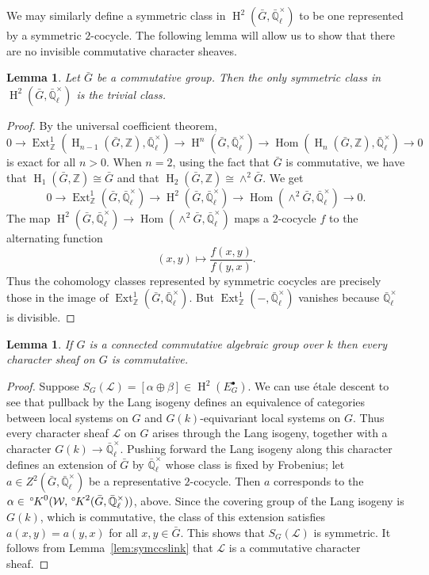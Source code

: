 \documentclass[10pt]{amsart}
\theoremstyle{plain}
\newtheorem{lemma}[theorem]{Lemma}
\theoremstyle{definition}
\newcommand{\ZZ}{{\mathbb{Z}}}
\newcommand{\EE}{\mathbb{\bar Q}_\ell}
\newcommand{\Fq}{k}
\newcommand{\EEx}{\EE^\times}
\newcommand{\Weil}[1]{\mathcal{W}_{#1}}
\DeclareMathOperator{\Hom}{Hom}
\DeclareMathOperator{\Ext}{Ext}
\DeclareMathOperator{\Hh}{H}
\newcommand{\cs}[1]{{\mathcal{#1}}}
\newcommand{\bG}{\bar{G}}
\newcommand{\oK}{{\,^\circ \hskip-1pt K}}
\begin{document}
We may similarly define a symmetric class in $\Hh^2(\bG, \EEx)$ to be one represented by a symmetric $2$-cocycle.
The following lemma will allow us to show that there are no invisible commutative character sheaves.

\begin{lemma} \label{lem:symtriv}
Let $\bG$ be a commutative group.  Then the only symmetric class in $\Hh^2(\bG, \EEx)$ is the trivial class.
\end{lemma}

\begin{proof}
By the universal coefficient theorem,
\[
0 \to \Ext^1_\ZZ(\Hh_{n-1}(\bG, \ZZ), \EEx) \to \Hh^n(\bG, \EEx) \to \Hom(\Hh_n(\bG, \ZZ), \EEx) \to 0
\]
is exact for all $n > 0$.  When $n = 2$, using the fact that $\bG$ is commutative, we have that $\Hh_1(\bG, \ZZ) \cong \bG$
and that $\Hh_2(\bG, \ZZ) \cong \wedge^2 \bG$. We get
\[
0 \to \Ext^1_\ZZ(\bG, \EEx) \to \Hh^2(\bG, \EEx) \to \Hom(\wedge^2 \bG, \EEx) \to 0.
\]
The map $\Hh^2(\bG, \EEx) \to \Hom(\wedge^2 \bG, \EEx)$ maps a $2$-cocycle $f$ to the alternating function
\[
(x,y) \mapsto \frac{f(x,y)}{f(y,x)}.
\]
Thus the cohomology classes represented by symmetric cocycles are precisely those in the image of $\Ext^1_\ZZ(\bG, \EEx)$.
But $\Ext^1_\ZZ(-, \EEx)$ vanishes because $\EEx$ is divisible.
\end{proof}

\begin{lemma} \label{lem:conncomm}
If $G$ is a connected commutative algebraic group over $\Fq$ then every character sheaf on $G$ is commutative.
\end{lemma}

\begin{proof}
Suppose $S_G(\cs{L}) = [\alpha\oplus \beta]\in \Hh^2(E_G^\bullet)$.
We can use \'etale descent to see that pullback by the Lang isogeny defines an equivalence
of categories between local systems on $G$ and $G(\Fq)$-equivariant local systems on $G$.  
Thus every character sheaf $\cs{L}$ on $G$ arises through the Lang isogeny, together with a character $G(\Fq) \to \EEx$.
Pushing forward the Lang isogeny along this character defines an extension of $\bG$ by $\EEx$ whose class is fixed by Frobenius; let $a\in Z^2(\bG, \EEx)$ be a representative $2$-cocycle.
Then $a$ corresponds to the $\alpha \in \oK^0(\Weil{}, \oK^2(\bG, \EEx))$, above. 
Since the covering group of the Lang isogeny is $G(k)$, which is commutative, the class of this extension satisfies $a(x,y) = a(y,x)$ for all $x,y \in \bG$. 
This shows that $S_{G}(\cs{L})$ is symmetric.
It follows from Lemma~\ref{lem:symccslink} that $\cs{L}$ is a commutative character sheaf.
\end{proof}
\end{document}
